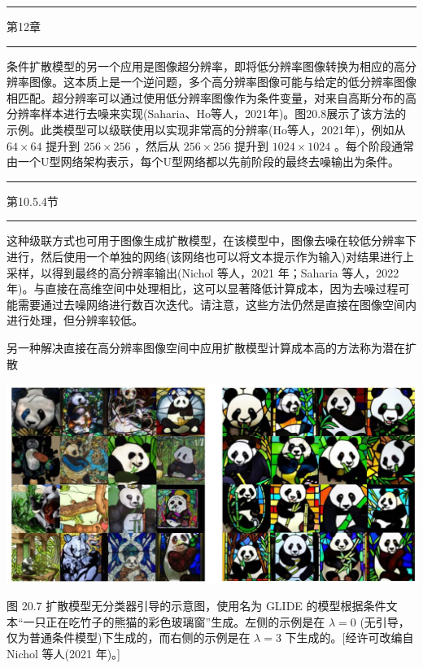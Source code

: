 \documentclass[10pt]{report}
\newcommand{\HRule}{\begin{center}\rule{0.9\linewidth}{0.2mm}\end{center}}
\begin{document}
\HRule

第12章

\HRule

条件扩散模型的另一个应用是图像超分辨率，即将低分辨率图像转换为相应的高分辨率图像。这本质上是一个逆问题，多个高分辨率图像可能与给定的低分辨率图像相匹配。超分辨率可以通过使用低分辨率图像作为条件变量，对来自高斯分布的高分辨率样本进行去噪来实现(Saharia、Ho等人，2021年)。图20.8展示了该方法的示例。此类模型可以级联使用以实现非常高的分辨率(Ho等人，2021年)，例如从 \({64} \times  {64}\) 提升到 \({256} \times  {256}\) ，然后从 \({256} \times  {256}\) 提升到 \({1024} \times  {1024}\) 。每个阶段通常由一个U型网络架构表示，每个U型网络都以先前阶段的最终去噪输出为条件。

\HRule

第10.5.4节

\HRule

这种级联方式也可用于图像生成扩散模型，在该模型中，图像去噪在较低分辨率下进行，然后使用一个单独的网络(该网络也可以将文本提示作为输入)对结果进行上采样，以得到最终的高分辨率输出(Nichol 等人，2021 年；Saharia 等人，2022 年)。与直接在高维空间中处理相比，这可以显著降低计算成本，因为去噪过程可能需要通过去噪网络进行数百次迭代。请注意，这些方法仍然是直接在图像空间内进行处理，但分辨率较低。

另一种解决直接在高分辨率图像空间中应用扩散模型计算成本高的方法称为潜在扩散

\begin{center}
\includegraphics[max width=1.0\textwidth]{images/0194e279-9b28-703a-88f4-c3ac21e2010d_621_217_343_1356_661_0.jpg}
\end{center}
\hspace*{3em} 

图 20.7 扩散模型无分类器引导的示意图，使用名为 GLIDE 的模型根据条件文本“一只正在吃竹子的熊猫的彩色玻璃窗”生成。左侧的示例是在 \(\lambda  = 0\) (无引导，仅为普通条件模型)下生成的，而右侧的示例是在 \(\lambda  = 3\) 下生成的。[经许可改编自 Nichol 等人(2021 年)。]
\end{document}
